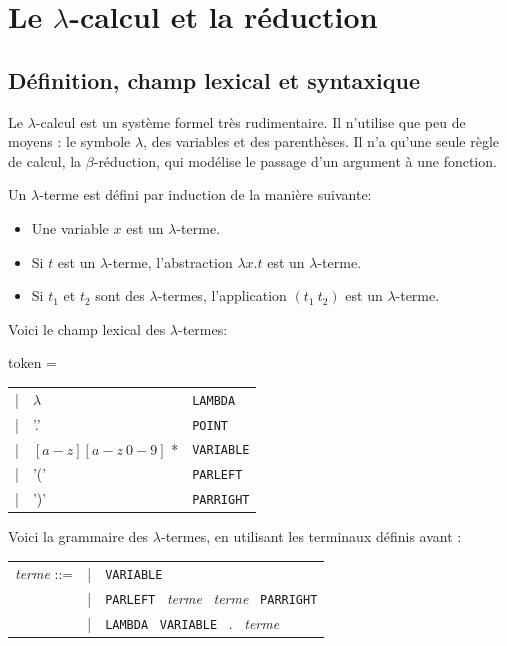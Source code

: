 \chapter{Le $\lambda$-calcul et la réduction}

\section{Définition, champ lexical et syntaxique}
Le $\lambda$-calcul est un système formel très rudimentaire. Il n'utilise que  
peu de moyens : le symbole $\lambda$, des variables et des parenthèses. Il n'a
qu'une seule règle de calcul, la $\beta$-réduction, qui modélise le passage d'un
argument à une fonction.

\begin{definition}
Un $\lambda $-terme est défini par induction de la manière suivante:
\begin{itemize}
  \item Une  variable $x$ est un $\lambda$-terme.
  \item Si $t$ est un $\lambda$-terme, l'abstraction $\lambda x.t$ est un $\lambda$-terme.
  \item Si $t_1$ et $t_2$ sont des $\lambda$-termes, l'application $(t_1 \ t_2)$ est un $\lambda$-terme.
\end{itemize}
\end{definition}


Voici le champ lexical des $\lambda $-termes:

\vspace{0.2cm}
token = \begin{tabular}{lll}
| & $\lambda$  & 	{ \verb+LAMBDA+ } \\
| & '.' &  { \verb+POINT+ } \\
| & $[ a-z ] [ a-z\  0-9 ]$ * & { \verb+VARIABLE+ } \\
| & '('	 &	{ \verb+PARLEFT+ } \\
| & ')'	 &	{ \verb+PARRIGHT+ }
\end{tabular}
\vspace{0.4cm}

Voici la grammaire des $\lambda $-termes, en utilisant les terminaux définis
avant :

\vspace{0.2cm}
\begin{tabular}{lll}
\textit{terme} ::= & | & \verb+VARIABLE+  \\
& | & \verb+PARLEFT+ \ \textit{terme} \ \textit{terme} \ \verb+PARRIGHT+ \\
& |& \verb+LAMBDA+ \ \verb+VARIABLE+ \  . \ \textit{terme}
\end{tabular}
\vspace{0.2cm}

